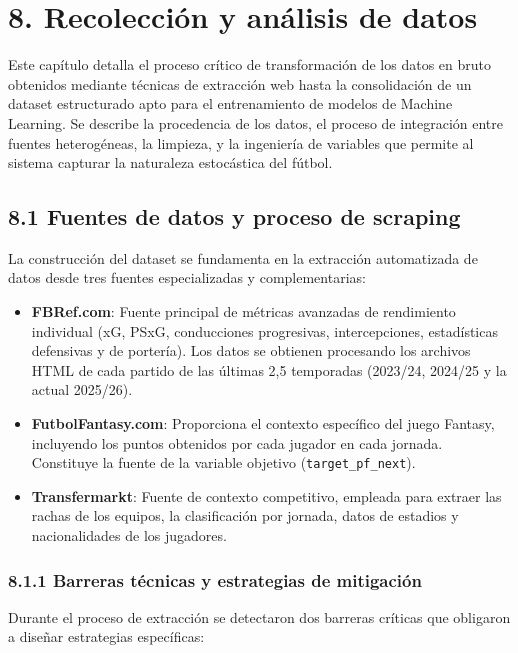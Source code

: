 \section*{8. Recolección y análisis de datos}
 
Este capítulo detalla el proceso crítico de transformación de los datos en bruto
obtenidos mediante técnicas de extracción web hasta la consolidación de un dataset
estructurado apto para el entrenamiento de modelos de Machine Learning. Se describe
la procedencia de los datos, el proceso de integración entre fuentes heterogéneas, la
limpieza, y la ingeniería de variables que permite al sistema capturar la naturaleza
estocástica del fútbol.
 
\subsection{8.1 Fuentes de datos y proceso de scraping}
 
La construcción del dataset se fundamenta en la extracción automatizada de datos desde
tres fuentes especializadas y complementarias:
 
\begin{itemize}
    \item \textbf{FBRef.com}: Fuente principal de métricas avanzadas de rendimiento
    individual (xG, PSxG, conducciones progresivas, intercepciones, estadísticas
    defensivas y de portería). Los datos se obtienen procesando los archivos HTML de
    cada partido de las últimas 2,5 temporadas (2023/24, 2024/25 y la actual 2025/26).
 
    \item \textbf{FutbolFantasy.com}: Proporciona el contexto específico del juego
    Fantasy, incluyendo los puntos obtenidos por cada jugador en cada jornada. Constituye
    la fuente de la variable objetivo (\texttt{target\_pf\_next}).
 
    \item \textbf{Transfermarkt}: Fuente de contexto competitivo, empleada para extraer
    las rachas de los equipos, la clasificación por jornada, datos de estadios y
    nacionalidades de los jugadores.
\end{itemize}
 
\subsubsection{8.1.1 Barreras técnicas y estrategias de mitigación}
 
Durante el proceso de extracción se detectaron dos barreras críticas que obligaron a
diseñar estrategias específicas:
 
